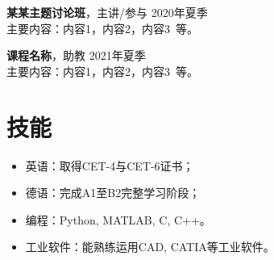 \vspace{1em}
{\large{\textbf{某某主题讨论班}}}，主讲/参与 \hfill {2020年夏季}\\
主要内容：内容1，内容2，内容3\ 等。

\vspace{1em}
{\large{\textbf{课程名称}}}，助教 \hfill {2021年夏季}\\
主要内容：内容1，内容2，内容3\ 等。

\section{\makebox[\widthof{\faWrench}][c]{\color{SZU_Pink}{\faWrench}}\quad 技能}
\vspace{0.5em}
\begin{itemize}
    \item 英语：取得CET-4与CET-6证书；
    \item 德语：完成A1至B2完整学习阶段；
    \item 编程：Python, MATLAB, C, C++。
    \item 工业软件：能熟练运用CAD, CATIA等工业软件。
\end{itemize}



